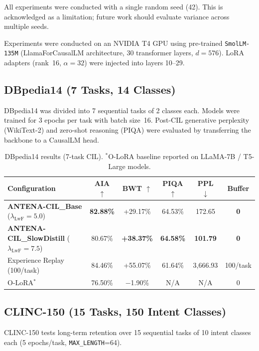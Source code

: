 \documentclass[11pt,a4paper]{article}
\begin{document}
All experiments were conducted with a single random seed (42). This is acknowledged as a limitation; future work should evaluate variance across multiple seeds.

Experiments were conducted on an NVIDIA T4 GPU using pre-trained \texttt{SmolLM-135M} (LlamaForCausalLM architecture, 30 transformer layers, $d=576$). LoRA adapters (rank~16, $\alpha=32$) were injected into layers 10--29.

\subsection{DBpedia14 (7 Tasks, 14 Classes)}

DBpedia14 was divided into 7 sequential tasks of 2 classes each. Models were trained for 3 epochs per task with batch size~16. Post-CIL generative perplexity (WikiText-2) and zero-shot reasoning (PIQA) were evaluated by transferring the backbone to a CausalLM head.

\begin{table}[htbp]
\centering
\caption{DBpedia14 results (7-task CIL). $^*$O-LoRA baseline reported on LLaMA-7B / T5-Large models.}
\label{tab:dbpedia}
\begin{tabular}{lccccc}
\toprule
Configuration & AIA $\uparrow$ & BWT $\uparrow$ & PIQA $\uparrow$ & PPL $\downarrow$ & Buffer \\
\midrule
\textbf{ANTENA-CIL\_Base} ($\lambda_{\text{LwF}}{=}5.0$) & \textbf{82.88\%} & +29.17\% & 64.53\% & 172.65 & \textbf{0} \\
\textbf{ANTENA-CIL\_SlowDistill} ($\lambda_{\text{LwF}}{=}7.5$) & 80.67\% & \textbf{+38.37\%} & \textbf{64.58\%} & \textbf{101.79} & \textbf{0} \\
Experience Replay (100/task) & 84.46\% & +55.07\% & 61.64\% & 3,666.93 & 100/task \\
O-LoRA$^*$ & 76.50\% & $-$1.90\% & N/A & N/A & 0 \\
\bottomrule
\end{tabular}
\end{table}

\subsection{CLINC-150 (15 Tasks, 150 Intent Classes)}

CLINC-150 tests long-term retention over 15 sequential tasks of 10 intent classes each (5 epochs/task, \texttt{MAX\_LENGTH}=64).
\end{document}
